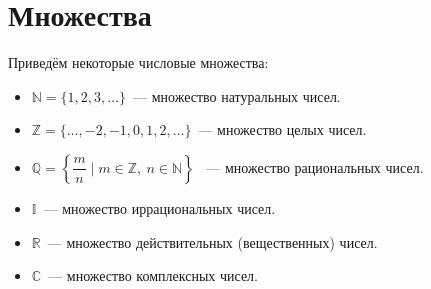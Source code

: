 \section{Множества}
 Приведём некоторые числовые множества:
\begin{itemize}
	\item $\mathbb N = \{ 1, 2, 3, \dots \}$~--- множество натуральных чисел.
	\item $\mathbb Z = \{ \dots, -2, -1, 0, 1, 2, \dots \}$~--- множество целых чисел.
	\item $\mathbb Q = \left\{ \dfrac{m}n \mid m \in \mathbb Z, \ n \in \mathbb N \right\}$
	~--- множество рациональных чисел.
	\item $\mathbb I$~--- множество иррациональных чисел.
	\item $\mathbb R$~--- множество действительных (вещественных) чисел.
	\item $\mathbb C$~--- множество комплексных чисел.
\end{itemize}